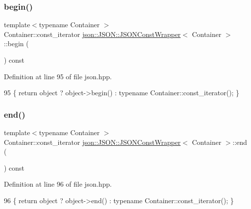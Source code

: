 \subsubsection{\texorpdfstring{begin()}{begin()}}
{\footnotesize\ttfamily template$<$typename Container $>$ \\
Container\+::const\+\_\+iterator \mbox{\hyperlink{classjson_1_1_j_s_o_n_1_1_j_s_o_n_const_wrapper}{json\+::\+J\+S\+O\+N\+::\+J\+S\+O\+N\+Const\+Wrapper}}$<$ Container $>$\+::begin (\begin{DoxyParamCaption}{ }\end{DoxyParamCaption}) const\hspace{0.3cm}{\ttfamily [inline]}}



Definition at line 95 of file json.\+hpp.


\begin{DoxyCode}
95 \{ \textcolor{keywordflow}{return} \textcolor{keywordtype}{object} ? \textcolor{keywordtype}{object}->begin() : \textcolor{keyword}{typename} Container::const\_iterator(); \}
\end{DoxyCode}
\mbox{\label{classjson_1_1_j_s_o_n_1_1_j_s_o_n_const_wrapper_a6cb9ecc57758b150b2bb39cb763bdf57}} 
\subsubsection{\texorpdfstring{end()}{end()}}
{\footnotesize\ttfamily template$<$typename Container $>$ \\
Container\+::const\+\_\+iterator \mbox{\hyperlink{classjson_1_1_j_s_o_n_1_1_j_s_o_n_const_wrapper}{json\+::\+J\+S\+O\+N\+::\+J\+S\+O\+N\+Const\+Wrapper}}$<$ Container $>$\+::end (\begin{DoxyParamCaption}{ }\end{DoxyParamCaption}) const\hspace{0.3cm}{\ttfamily [inline]}}



Definition at line 96 of file json.\+hpp.


\begin{DoxyCode}
96 \{ \textcolor{keywordflow}{return} \textcolor{keywordtype}{object} ? \textcolor{keywordtype}{object}->end() : \textcolor{keyword}{typename} Container::const\_iterator(); \}
\end{DoxyCode}



